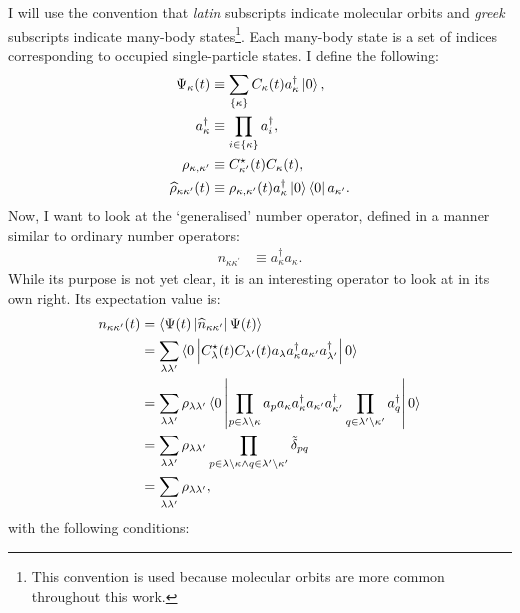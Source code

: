 I will use the convention that \emph{latin} subscripts indicate molecular orbits and \emph{greek} subscripts indicate many-body states\footnote{This convention is used because molecular orbits are more common throughout this work.}. Each many-body state is a set of indices corresponding to occupied single-particle states. I define the following:
\begin{align*}
\Psi_\kappa (t) &\equiv \sum_{ \left\{\kappa\right\}} C_\kappa(t) a_\kappa^\dagger \ket{0}, \\
a^\dagger_\kappa &\equiv \prod_{ i \in \left\{\kappa\right\}} a_i^\dagger, \\
\rho_{\kappa,\kappa^\prime} & \equiv C_{\kappa'}^\star (t) C_\kappa (t),
\\
\widehat{\rho}_{\kappa\kappa^\prime}(t) &\equiv \rho_{\kappa,\kappa^\prime} (t) a_{\kappa}^\dagger \ket{0}\bra{0}a_{\kappa^\prime}.
\end{align*}
Now, I want to look at the `generalised' number operator, defined in a manner similar to ordinary number operators: 
\begin{align}
n_{\kappa\kappa^\prime} &\equiv a^\dagger_\kappa a_\kappa. \label{eq:gennum}
\end{align}
While its purpose is not yet clear, it is an interesting operator to look at in its own right. Its expectation value is:
\begin{align*}
n_{\kappa\kappa^\prime} (t) &= \braket{\Psi (t) \left| \widehat{n}_{\kappa\kappa^\prime}\right|\Psi (t)} \\
&=\sum_{\lambda\lambda^\prime} \braket{0\left| C_\lambda^\star (t) C_{\lambda^\prime} (t) a_\lambda a_\kappa^\dagger a_{\kappa^\prime} a_{\lambda^\prime}^\dagger \right|0}
\\
&= \sum_{\lambda\lambda^\prime} \rho_{\lambda\lambda^\prime} \braket{0\left| \prod_{p \in \lambda\setminus{\kappa}} a_p a_\kappa a_\kappa^\dagger a_{\kappa^\prime} a_{\kappa^\prime}^\dagger \prod_{q \in \lambda^\prime\setminus{\kappa^\prime}}a_q^\dagger \right|0}
\\
&= \sum_{\lambda\lambda^\prime} \rho_{\lambda\lambda^\prime} \prod_{p \in \lambda\setminus{\kappa} \wedge q \in \lambda^\prime\setminus{\kappa^\prime}} \tilde{\delta}_{pq}
\\
&=  \sum_{\lambda\lambda^\prime} \rho_{\lambda\lambda^\prime},
\end{align*}with the following conditions:
